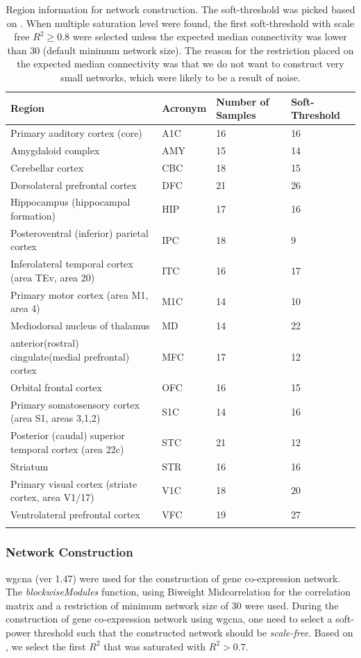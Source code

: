 \begin{table}
	\centering
	\caption[Region information for network construction]{Region information for network construction.
		The soft-threshold was picked based on \citet{Langfelder2008}.
		When multiple saturation level were found, the first soft-threshold with scale free $R^2 \ge 0.8$ were selected unless the expected median connectivity was lower than 30 (default minimum network size).
		The reason for the restriction placed on the expected median connectivity was that we do not want to construct very small networks, which were likely to be a result of noise.
	}
	\begin{tabular}{p{9cm}p{1.5cm}p{2cm}p{1.5cm}}
		\toprule
		Region & Acronym & Number of Samples & Soft-Threshold \\
		\midrule
		 Primary auditory cortex (core) & A1C & 16 & 16 \\%
		 Amygdaloid complex & AMY & 15 & 14 \\%
		 Cerebellar cortex & CBC & 18 & 15 \\
		 Dorsolateral prefrontal cortex & DFC & 21 & 26\\
		 Hippocampus (hippocampal formation) & HIP & 17 & 16 \\
		 Posteroventral (inferior) parietal cortex & IPC & 18 & 9 \\
		 Inferolateral temporal cortex (area TEv, area 20) & ITC & 16 & 17 \\ %
		 Primary motor cortex (area M1, area 4) & M1C & 14 & 10  \\ 
		 Mediodorsal nucleus of thalamus & MD & 14 & 22  \\
		 anterior(rostral) cingulate(medial prefrontal) cortex & MFC & 17 & 12 \\
		 Orbital frontal cortex & OFC & 16 & 15 \\
		 Primary somatosensory cortex (area S1, areas 3,1,2) & S1C & 14 & 16 \\
		 Posterior (caudal) superior temporal cortex (area 22c) & STC & 21 & 12 \\
		 Striatum & STR & 16 & 16 \\
		 Primary visual cortex (striate cortex, area V1/17) & V1C & 18 & 20 \\
		 Ventrolateral prefrontal cortex & VFC & 19 & 27\\
		\bottomrule
		\label{tab:regionSample}
	\end{tabular}
\end{table}
\subsubsection{Network Construction}
\gls{wgcna} (ver 1.47) were used for the construction of gene co-expression network\citep{Langfelder2008}. 
The \emph{blockwiseModules} function, using Biweight Midcorrelation for the correlation matrix and a restriction of minimum network size of 30 were used.
During the construction of gene co-expression network using \gls{wgcna}, one need to select a soft-power threshold such that the constructed network should be \emph{scale-free}.
Based on \citet{Zhang2005}, we select the first $R^2$ that was saturated with $R^2>0.7$. 

